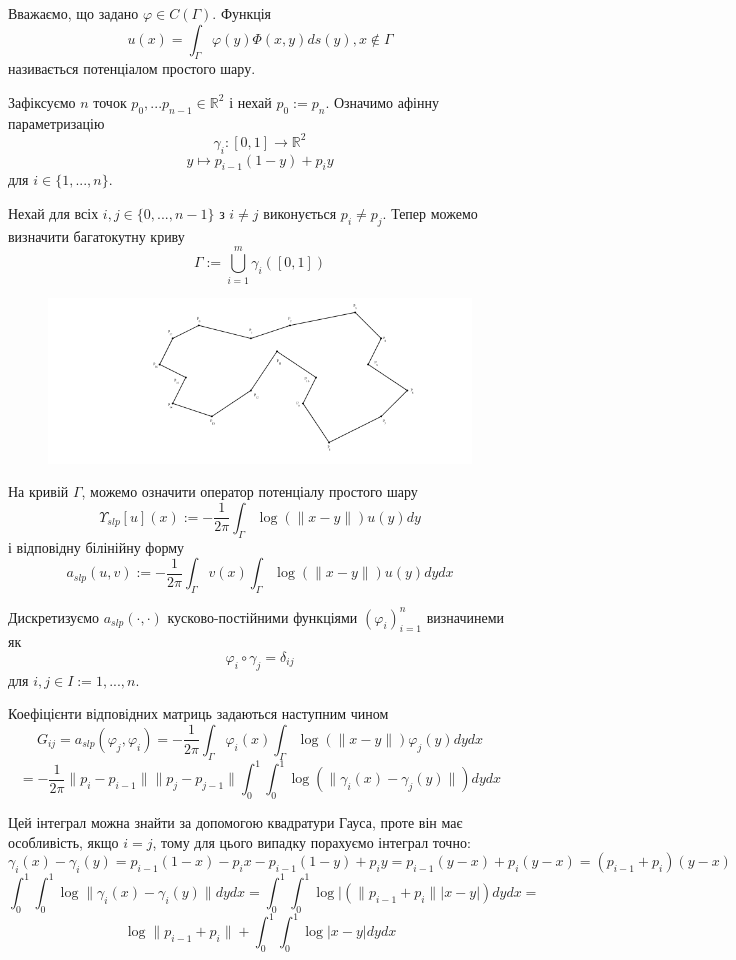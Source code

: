 \documentclass[12pt]{report}
\begin{document}
	\begin{Def}
		Вважаємо, що задано $\varphi\in C(\Gamma)$. Функція $$u(x)=\int_{\Gamma}\varphi(y)\Phi(x,y)ds(y),  x\not\in\Gamma$$
		називається потенціалом простого шару.
	\end{Def}
	\par Зафіксуємо $n$ точок $p_0,...p_{n-1}\in \mathbb{R}^2$ і нехай $p_0:=p_n$. Означимо афінну параметризацію $$\gamma_i:[0,1]\rightarrow\mathbb{R}^2$$
	$$y\mapsto p_{i-1}(1-y)+p_iy$$
	для $i\in\{1,...,n\}$.
	\par Нехай для всіх $i,j\in\{0,...,n-1\}$ з $i\not=j$ виконується $p_i\not=p_j$. Тепер можемо визначити багатокутну криву
	$$\Gamma:=\bigcup_{i=1}^m\gamma_i([0,1])$$
	\begin{figure}[h]{
			\includegraphics{2_2}
		}
	\end{figure}
	\par На кривій $\Gamma$, можемо означити оператор потенціалу простого шару
	$$\Upsilon_{slp}[u](x):=-\frac{1}{2\pi}\int_{\Gamma}\log(\|x-y\|)u(y)dy$$
	і відповідну білінійну форму
	$$a_{slp}(u,v):=-\frac{1}{2\pi}\int_{\Gamma}v(x)\int_{\Gamma}\log(\|x-y\|)u(y)dydx$$
	\par Дискретизуємо $a_{slp}(\cdot,\cdot)$ кусково-постійними функціями $(\varphi_i)_{i=1}^n$ визначинеми як $$\varphi_i\circ\gamma_j=\delta_{ij}$$
	для $i,j\in I:={1,...,n}$.
	\par Коефіцієнти відповідних матриць задаються наступним чином $$G_{ij}=a_{slp}(\varphi_j,\varphi_i)=-\frac{1}{2\pi}\int_{\Gamma}\varphi_i(x)\int_{\Gamma}\log(\|x-y\|)\varphi_j(y)dydx$$
	$$=-\frac{1}{2\pi}\|p_i-p_{i-1}\| \|p_j-p_{j-1}\|\int_{0}^{1}\int_{0}^{1}\log(\|\gamma_i(x)-\gamma_j(y)\|)dydx$$
	\par Цей інтеграл можна знайти за допомогою квадратури Гауса, проте він має особливість, якщо $i=j$, тому для цього випадку порахуємо інтеграл точно:
	$$\gamma_i(x)-\gamma_i(y) = p_{i-1}(1-x)-p_ix-p_{i-1}(1-y)+p_iy=p_{i-1}(y-x)+p_i(y-x)=(p_{i-1}+p_i)(y-x)$$
	$$\int_{0}^{1}\int_{0}^{1}\log\|\gamma_i(x)-\gamma_i(y)\|dydx=\int_{0}^{1}\int_{0}^{1}\log|(\|p_{i-1}+p_i\||x-y|)dydx =$$$$ \log\|p_{i-1}+p_i\|+\int_{0}^{1}\int_{0}^{1}\log|x-y|dydx$$
\end{document}
